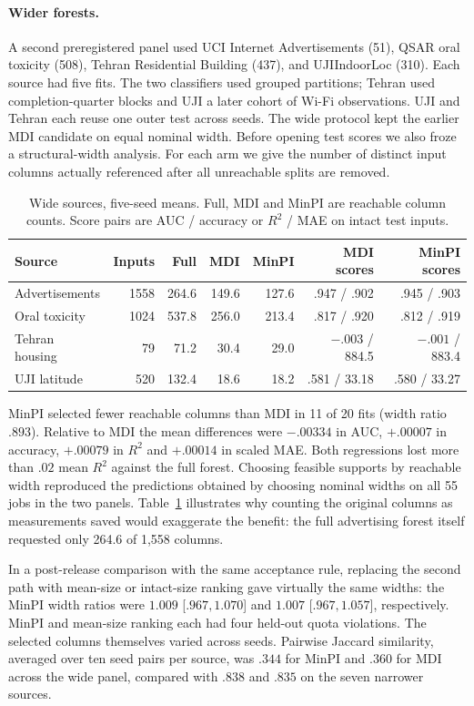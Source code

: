 \paragraph{Wider forests.}
A second preregistered panel used UCI Internet Advertisements (51), QSAR
oral toxicity (508), Tehran Residential Building (437), and UJIIndoorLoc
(310). Each source had five fits. The two classifiers used grouped
partitions; Tehran used completion-quarter blocks and UJI a later cohort
of Wi-Fi observations. UJI and Tehran each reuse one outer test across
seeds. The wide protocol kept the earlier MDI candidate on equal nominal
width. Before opening test scores we also froze a structural-width
analysis. For each arm we give the number of distinct input columns
actually referenced after all unreachable splits are removed.

\begin{table}[t]
\centering\small
\caption{Wide sources, five-seed means. Full, MDI and MinPI are reachable
column counts. Score pairs are AUC / accuracy or $R^2$ / MAE on intact
test inputs.}\label{tab:wide}
\begin{tabular}{lrrrrrr}
\toprule
Source & Inputs & Full & MDI & MinPI & MDI scores & MinPI scores\\
\midrule
Advertisements & 1558 & 264.6 & 149.6 & 127.6 & .947 / .902 & .945 / .903\\
Oral toxicity  & 1024 & 537.8 & 256.0 & 213.4 & .817 / .920 & .812 / .919\\
Tehran housing & 79   &  71.2 &  30.4 &  29.0 & $-.003$ / 884.5 & $-.001$ / 883.4\\
UJI latitude   & 520  & 132.4 &  18.6 &  18.2 & .581 / 33.18 & .580 / 33.27\\
\bottomrule
\end{tabular}
\end{table}

MinPI selected fewer reachable columns than MDI in 11 of 20 fits (width
ratio $.893$). Relative to MDI the mean differences were $-.00334$ in AUC,
$+.00007$ in accuracy, $+.00079$ in $R^2$ and $+.00014$ in scaled MAE.
Both regressions lost more than $.02$ mean $R^2$ against the full forest.
Choosing feasible supports by reachable width reproduced the predictions
obtained by choosing nominal widths on all 55 jobs in the two panels.
Table~\ref{tab:wide} illustrates why counting the original columns as
measurements saved would exaggerate the benefit: the full advertising
forest itself requested only 264.6 of 1,558 columns.

In a post-release comparison with the same acceptance rule, replacing the
second path with mean-size or intact-size ranking gave virtually the same
widths: the MinPI width ratios were $1.009$ [$ .967,1.070$] and $1.007$
[$ .967,1.057$], respectively. MinPI and mean-size ranking each had four
held-out quota violations. The selected columns themselves varied across
seeds. Pairwise Jaccard similarity, averaged over ten seed pairs per source,
was $.344$ for MinPI and $.360$ for MDI across the wide panel, compared
with $.838$ and $.835$ on the seven narrower sources.

